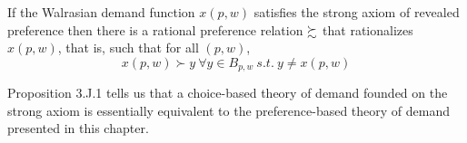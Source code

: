 \documentclass{article}
\begin{document}
 			\begin{proposition}[3.J.1]
 				If the Walrasian demand function $x(p, w)$ satisfies the strong axiom of revealed preference then there is a rational preference relation $\succsim$ that rationalizes $x(p, w)$, that is, such that for all $(p, w)$, 
 				\begin{equation}
 					x(p, w) \succ y\ \forall y \in B_{p, w}\ s.t.\ y \neq x(p, w)
 				\end{equation}
 			\end{proposition}
 			
 			\begin{remark}
 				Proposition 3.J.1 tells us that a choice-based theory of demand founded on the strong axiom is essentially equivalent to the preference-based theory of demand presented in this chapter.
 			\end{remark}
\end{document}
